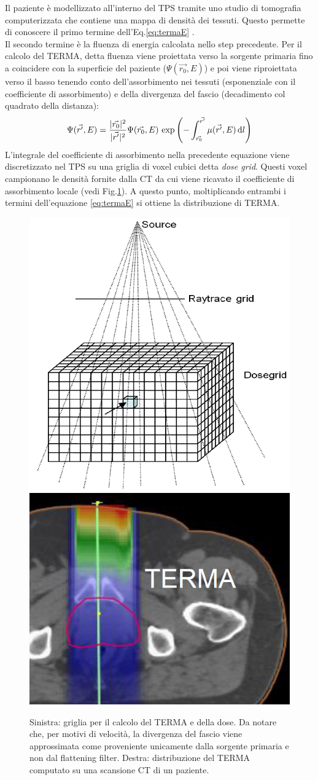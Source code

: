 {Il paziente è modellizzato all'interno del TPS tramite uno studio di tomografia computerizzata che contiene una mappa di densità dei tessuti. Questo permette di conoscere il primo termine dell'Eq.\eqref{eq:termaE} \cite{RaySearchLaboratories2014}.\\
Il secondo termine è la fluenza di energia calcolata nello step precedente. Per il calcolo del TERMA, detta fluenza viene proiettata verso la sorgente primaria fino a coincidere con la superficie del paziente ($\Psi(\vec{r_0},E)$) e poi viene riproiettata verso il basso tenendo conto dell'assorbimento nei tessuti (esponenziale con il coefficiente di assorbimento) e della divergenza del fascio (decadimento col quadrato della distanza):
\begin{equation}
\label{eq:fluence}
\Psi(\vec{r'},E) = \frac{|\vec{r_0}|^2}{|\vec{r'}|^2}\Psi(\vec{r_0},E)\,\exp{\left( -\int_{\vec{r_0}}^{\vec{r'}} \mu(\vec{r'},E) \,\text{d}l \right)}
\end{equation}
L'integrale del coefficiente di assorbimento nella precedente equazione viene discretizzato nel TPS su una griglia di voxel cubici detta \textit{dose grid}. Questi voxel campionano le densità fornite dalla CT da cui viene ricavato il coefficiente di assorbimento locale (vedi Fig.\ref{fig:terma}). A questo punto, moltiplicando entrambi i termini dell'equazione \eqref{eq:termaE} si ottiene la distribuzione di TERMA.

\begin{figure}
\centering
\includegraphics[width=.4\textwidth]{./cap1/terma_1.png}
\includegraphics[width=.5\textwidth]{./cap1/terma_2.png}
\caption{Sinistra: griglia per il calcolo del TERMA e della dose. Da notare che, per motivi di velocità, la divergenza del fascio viene approssimata come proveniente unicamente dalla sorgente primaria e non dal flattening filter. Destra: distribuzione del TERMA computato su una scansione CT di un paziente.}
\label{fig:terma}
\end{figure}

}

